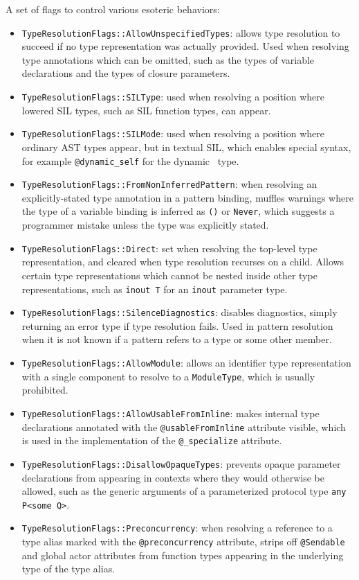 \documentclass[../generics]{subfiles}
\begin{document}
A set of flags to control various esoteric behaviors:
\begin{itemize}
\item \texttt{TypeResolutionFlags::AllowUnspecifiedTypes}: allows type resolution to succeed if no type representation was actually provided. Used when resolving type annotations which can be omitted, such as the types of variable declarations and the types of closure parameters.
\item \texttt{TypeResolutionFlags::SILType}: used when resolving a position where lowered SIL types, such as SIL function types, can appear.
\item \texttt{TypeResolutionFlags::SILMode}: used when resolving a position where ordinary AST types appear, but in textual SIL, which enables special syntax, for example \verb|@dynamic_self| for the dynamic \tSelf\ type.
\item \texttt{TypeResolutionFlags::FromNonInferredPattern}: when resolving an explicitly-stated type annotation in a pattern binding, muffles warnings where the type of a variable binding is inferred as \texttt{()} or \texttt{Never}, which suggests a programmer mistake unless the type was explicitly stated.
\item \texttt{TypeResolutionFlags::Direct}: set when resolving the top-level type representation, and cleared when type resolution recurses on a child. Allows certain type representations which cannot be nested inside other type representations, such as \texttt{inout T} for an \texttt{inout} parameter type.
\item \texttt{TypeResolutionFlags::SilenceDiagnostics}: disables diagnostics, simply returning an error type if type resolution fails. Used in pattern resolution when it is not known if a pattern refers to a type or some other member.
\item \texttt{TypeResolutionFlags::AllowModule}: allows an identifier type representation with a single component to resolve to a \texttt{ModuleType}, which is usually prohibited.
\item \texttt{TypeResolutionFlags::AllowUsableFromInline}: makes internal type declarations annotated with the \texttt{@usableFromInline} attribute visible, which is used in the implementation of the \verb|@_specialize| attribute.
\item \texttt{TypeResolutionFlags::DisallowOpaqueTypes}: prevents opaque parameter declarations from appearing in contexts where they would otherwise be allowed, such as the generic arguments of a parameterized protocol type \verb|any P<some Q>|.
\item \texttt{TypeResolutionFlags::Preconcurrency}: when resolving a reference to a type alias marked with the \texttt{@preconcurrency} attribute, strips off \texttt{@Sendable} and global actor attributes from function types appearing in the underlying type of the type alias.
\end{itemize}
\end{document}
